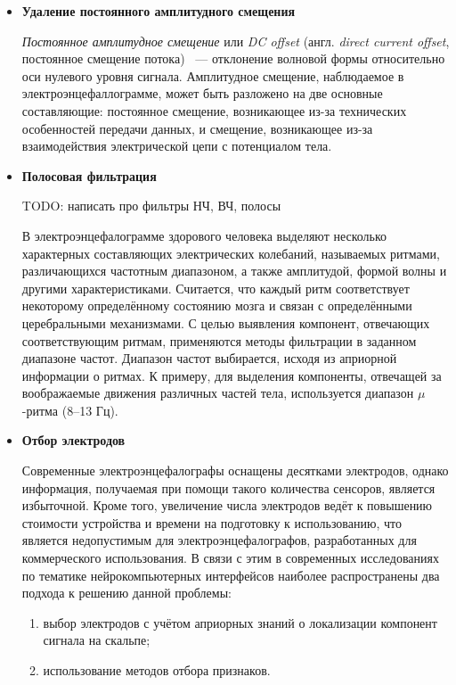 \documentclass[12pt,fleqn]{article}
\begin{document}
	\begin{itemize}
	\item {\bf Удаление постоянного амплитудного смещения}
	\par {\it Постоянное амплитудное смещение} или {\it DC offset} (англ. {\it direct current offset}, постоянное смещение потока) ~--- отклонение волновой формы относительно оси нулевого уровня сигнала. Амплитудное смещение, наблюдаемое в электроэнцефаллограмме, может быть разложено на две основные составляющие: постоянное смещение, возникающее из-за технических особенностей передачи данных, и  смещение, возникающее из-за взаимодействия электрической цепи с потенциалом тела.
	\item {\bf Полосовая фильтрация}
	\par TODO: написать про фильтры НЧ, ВЧ, полосы
	\par В электроэнцефалограмме здорового человека выделяют несколько характерных составляющих электрических колебаний, называемых ритмами, различающихся частотным диапазоном, а также амплитудой, формой волны и другими характеристиками. Считается, что каждый ритм соответствует некоторому определённому состоянию мозга и связан с определёнными церебральными механизмами. С целью выявления компонент, отвечающих соответствующим ритмам, применяются методы фильтрации в заданном диапазоне частот. Диапазон частот выбирается, исходя из априорной информации о ритмах. К примеру, для выделения компоненты, отвечащей за воображаемые движения различных частей тела, используется диапазон $\mu$-ритма (8--13 Гц).
	\item {\bf Отбор электродов}
	\par Современные электроэнцефалографы оснащены десятками электродов, однако информация, получаемая при помощи такого количества сенсоров, является избыточной. Кроме того, увеличение числа электродов ведёт к повышению стоимости устройства и времени на подготовку к использованию, что является недопустимым для электроэнцефалографов, разработанных для коммерческого использования. В связи с этим в современных исследованиях по тематике нейрокомпьютерных интерфейсов наиболее распространены два подхода к решению данной проблемы:
	\begin{enumerate}
	\item выбор электродов с учётом априорных знаний о локализации компонент сигнала на скальпе;
	\item использование методов отбора признаков.
	\end{enumerate}
	\end{itemize}
\end{document}
